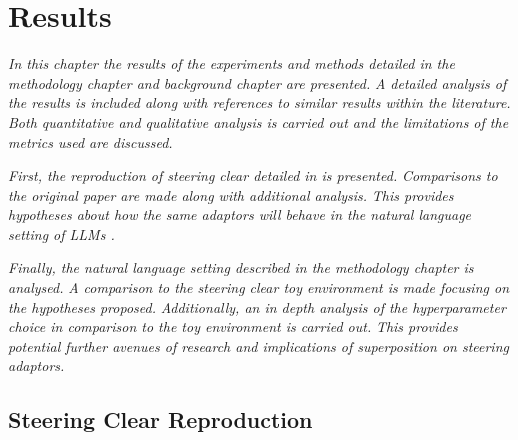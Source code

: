 \chapter{Results}
\label{ch:results}

\emph{In this chapter the results of the experiments and methods detailed in the methodology chapter  and background chapter  are presented.}
\emph{A detailed analysis of the results is included along with references to similar results within the literature.}
\emph{Both quantitative and qualitative analysis is carried out and the limitations of the metrics used are discussed.}

\emph{First, the reproduction of steering clear \citep{steering-clear} detailed in  is presented.}
\emph{Comparisons to the original paper are made along with additional analysis.}
\emph{This provides hypotheses about how the same adaptors will behave in the natural language setting of LLMs .}

\emph{Finally, the natural language setting described in the methodology chapter  is analysed.}
\emph{A comparison to the steering clear toy environment is made focusing on the hypotheses proposed.}
\emph{Additionally, an in depth analysis of the hyperparameter choice in comparison to the toy environment is carried out.}
\emph{This provides potential further avenues of research and implications of superposition  on steering adaptors.}

\section{Steering Clear Reproduction}
\label{sec:steering-clear-res}


